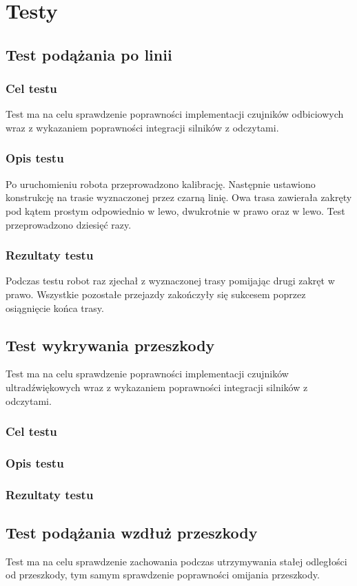 \chapter{Testy}
\section{Test podążania po linii}
\subsection{Cel testu}
Test ma na celu sprawdzenie poprawności implementacji czujników odbiciowych wraz z wykazaniem poprawności integracji silników z odczytami.
\subsection{Opis testu}
Po uruchomieniu robota przeprowadzono kalibrację. Następnie ustawiono konstrukcję na trasie wyznaczonej przez czarną linię. Owa trasa zawierała zakręty pod kątem prostym odpowiednio w lewo, dwukrotnie w prawo oraz w lewo. Test przeprowadzono dziesięć razy.
\subsection{Rezultaty testu}
Podczas testu robot raz zjechał z wyznaczonej trasy pomijając drugi zakręt w prawo. Wszystkie pozostałe przejazdy zakończyły się sukcesem poprzez osiągnięcie końca trasy.

\section{Test wykrywania przeszkody}
Test ma na celu sprawdzenie poprawności implementacji czujników ultradźwiękowych wraz z wykazaniem poprawności integracji silników z odczytami.
\subsection{Cel testu}
\subsection{Opis testu}
\subsection{Rezultaty testu}

\section{Test podążania wzdłuż przeszkody}
Test ma na celu sprawdzenie zachowania podczas utrzymywania stałej odległości od przeszkody, tym samym sprawdzenie poprawności omijania przeszkody.
